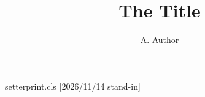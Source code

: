 \begin{filecontents*}[overwrite]{setterprint.cls}
[2026/11/14 stand-in]
\renewcommand\title[1]{{\centering\Large #1\par}}
\renewcommand\author[1]{{\centering #1\par}}
\renewcommand\maketitle{\newpage}
\end{filecontents*}
\documentclass{setterprint}

\title{The Title}
\author{A. Author}
Dated May 14th.
\maketitle
Body.

